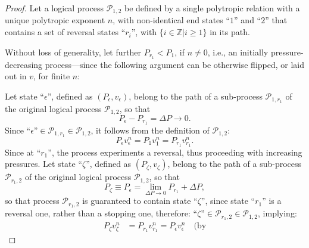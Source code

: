 \documentclass[fleqn,11pt]{SelfArx}
\begin{document}
    \begin{proof}
        Let a logical process $\mathcal{P}_{1,2}$ be defined by  a  single  polytropic  relation
        with a unique polytropic exponent $n$, with non-identical end states ``$1$'' and ``$2$''
        that contains a set of reversal  states  ``$r_i$'',  with  $\{  i  \in  \mathbb{Z}  |  i
        \geqslant 1 \}$ in its path.

        Without loss of generality, let further $P_{r_1}  <  P_1$,  if  $n  \neq  0$,  i.e.,  an
        initially pressure-decreasing process---since the following argument  can  be  otherwise
        flipped, or laid out in $v$, for finite $n$:

        Let state ``$\epsilon$'', defined as $(P_{\epsilon}, v_{\epsilon})$, belong to the  path
        of   a   sub-process   $\mathcal{P}_{1,r_1}$   of   the   original    logical    process
        $\mathcal{P}_{1,2}$, so that
        \begin{equation}
            P_{\epsilon} - P_{r_1} = \Delta P \to 0.
            \label{eq:proof.Delta.P.epsi}
        \end{equation}
        Since $\mbox{``}\epsilon\mbox{''} \in  \mathcal{P}_{1,r_1}  \in  \mathcal{P}_{1,2}$,  it
        follows from the definition of $\mathcal{P}_{1,2}$:
        \begin{equation}
            P_{\epsilon}v_{\epsilon}^n = P_1v_1^n = P_{r_1}v_{r_1}^n.
            \label{eq:proof.Process.epsi}
        \end{equation}
        Since at ``$r_1$'', the process experiments a reversal, thus proceeding with  increasing
        pressures. Let state ``$\zeta$'', defined as $(P_{\zeta},  v_{\zeta})$,  belong  to  the
        path  of  a  sub-process  $\mathcal{P}_{r_1,2}$  of   the   original   logical   process
        $\mathcal{P}_{1,2}$, so that
        \begin{equation}
            P_{\zeta} \equiv P_{\epsilon} = \lim_{\Delta P \to 0} P_{r_1} + \Delta P,
            \label{eq:proof.P.zeta}
        \end{equation}
        \noindent  so  that  process  $\mathcal{P}_{r_1,2}$  is  guaranteed  to  contain   state
        ``$\zeta$'', since state ``$r_1$'' is a  reversal  one,  rather  than  a  stopping  one,
        therefore:  $\mbox{``}\zeta\mbox{''}  \in  \mathcal{P}_{r_1,2}  \in  \mathcal{P}_{1,2}$,
        implying:
        \begin{align}
            P_{\zeta}v_{\zeta}^n & = P_{r_1}v_{r_1}^n = P_{\epsilon}v_{\epsilon}^n\quad\mbox{(by
}
\end{align}
\end{proof}
\end{document}
